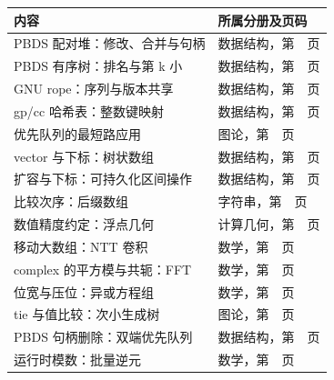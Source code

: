 \begin{longtable}{p{80mm}p{65mm}}\toprule 内容 & 所属分册及页码\\\midrule\endhead

PBDS 配对堆：修改、合并与句柄 & 数据结构，第~\pageref{ext-data-structures-compact-pheap}~页\\

PBDS 有序树：排名与第 k 小 & 数据结构，第~\pageref{ext-data-structures-compact-ost}~页\\

GNU rope：序列与版本共享 & 数据结构，第~\pageref{ext-data-structures-compact-rp}~页\\

gp/cc 哈希表：整数键映射 & 数据结构，第~\pageref{ext-data-structures-compact-gp_map}~页\\

优先队列的最短路应用 & 图论，第~\pageref{ext-graphs-compact-Dijkstra}~页\\

vector 与下标：树状数组 & 数据结构，第~\pageref{ext-data-structures-compact-Fenwick}~页\\

扩容与下标：可持久化区间操作 & 数据结构，第~\pageref{ext-data-structures-compact-PersistentRange}~页\\

比较次序：后缀数组 & 字符串，第~\pageref{ext-strings-compact-SuffixArray}~页\\

数值精度约定：浮点几何 & 计算几何，第~\pageref{ext-geometry-compact-RealPlane}~页\\

移动大数组：NTT 卷积 & 数学，第~\pageref{ext-mathematics-compact-NttConvolution}~页\\

complex 的平方模与共轭：FFT & 数学，第~\pageref{ext-mathematics-compact-ComplexFFT}~页\\

位宽与压位：异或方程组 & 数学，第~\pageref{ext-mathematics-compact-GaussXor}~页\\

tie 与值比较：次小生成树 & 图论，第~\pageref{ext-graphs-compact-SecondMST}~页\\

PBDS 句柄删除：双端优先队列 & 数据结构，第~\pageref{ext-data-structures-usage-example-189}~页\\

运行时模数：批量逆元 & 数学，第~\pageref{ext-mathematics-usage-example-198}~页\\

\bottomrule\end{longtable}

\backmatter\printindex


